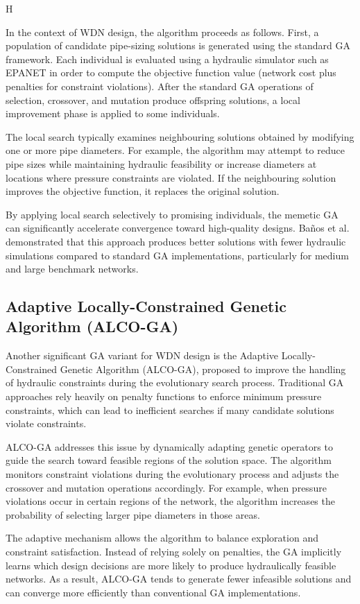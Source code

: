 H\documentclass[12pt, a4paper]{article}
\begin{document}
In the context of WDN design, the algorithm proceeds as follows. First, a population of candidate pipe-sizing solutions is generated using the standard GA framework. Each individual is evaluated using a hydraulic simulator such as EPANET in order to compute the objective function value (network cost plus penalties for constraint violations). After the standard GA operations of selection, crossover, and mutation produce offspring solutions, a local improvement phase is applied to some individuals.

The local search typically examines neighbouring solutions obtained by modifying one or more pipe diameters. For example, the algorithm may attempt to reduce pipe sizes while maintaining hydraulic feasibility or increase diameters at locations where pressure constraints are violated. If the neighbouring solution improves the objective function, it replaces the original solution.

By applying local search selectively to promising individuals, the memetic GA can significantly accelerate convergence toward high-quality designs. Ba\~nos et al. demonstrated that this approach produces better solutions with fewer hydraulic simulations compared to standard GA implementations, particularly for medium and large benchmark networks.

\subsection*{Adaptive Locally-Constrained Genetic Algorithm (ALCO-GA)}

Another significant GA variant for WDN design is the Adaptive Locally-Constrained Genetic Algorithm (ALCO-GA), proposed to improve the handling of hydraulic constraints during the evolutionary search process\cite{ref15}. Traditional GA approaches rely heavily on penalty functions to enforce minimum pressure constraints, which can lead to inefficient searches if many candidate solutions violate constraints.

ALCO-GA addresses this issue by dynamically adapting genetic operators to guide the search toward feasible regions of the solution space. The algorithm monitors constraint violations during the evolutionary process and adjusts the crossover and mutation operations accordingly. For example, when pressure violations occur in certain regions of the network, the algorithm increases the probability of selecting larger pipe diameters in those areas.

The adaptive mechanism allows the algorithm to balance exploration and constraint satisfaction. Instead of relying solely on penalties, the GA implicitly learns which design decisions are more likely to produce hydraulically feasible networks. As a result, ALCO-GA tends to generate fewer infeasible solutions and can converge more efficiently than conventional GA implementations.
\end{document}
